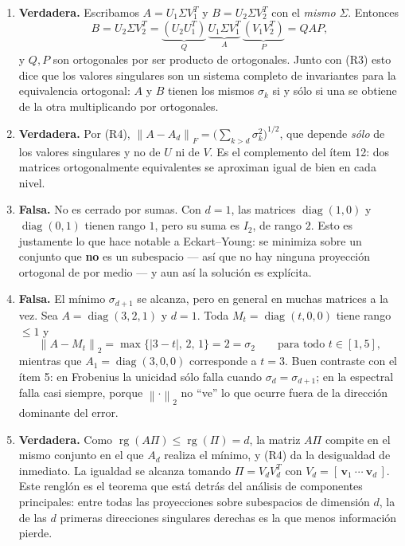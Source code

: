 \documentclass[11pt,a4paper]{article}
\newenvironment{solucion}{\solucionfmt}{\endsolucionfmt}
\newcommand{\bi}[1]{\boldsymbol{#1}}
\DeclareMathOperator{\rg}{rg}
\DeclareMathOperator{\diag}{diag}
\newcommand{\normF}[1]{\left\|#1\right\|_{F}}
\newcommand{\normdos}[1]{\left\|#1\right\|_{2}}
\begin{document}
\begin{solucion}
\begin{enumerate}[label=\textbf{\arabic*.},itemsep=4pt,topsep=4pt,leftmargin=*]
\item \textbf{Verdadera.} Escribamos $A=U_1\Sigma V_1^T$ y $B=U_2\Sigma V_2^T$
con el \emph{mismo} $\Sigma$. Entonces
\[
B=U_2\Sigma V_2^T
=\underbrace{(U_2U_1^T)}_{Q}\,\underbrace{U_1\Sigma V_1^T}_{A}\,
\underbrace{(V_1V_2^T)}_{P} = QAP ,
\]
y $Q,P$ son ortogonales por ser producto de ortogonales. Junto con (R3) esto
dice que los valores singulares son un sistema completo de invariantes para
la equivalencia ortogonal: $A$ y $B$ tienen los mismos $\sigma_k$ si y sólo
si una se obtiene de la otra multiplicando por ortogonales.

\item \textbf{Verdadera.} Por (R4), $\normF{A-A_d}=\bigl(\sum_{k>d}\sigma_k^2\bigr)^{1/2}$,
que depende \emph{sólo} de los valores singulares y no de $U$ ni de $V$. Es
el complemento del ítem 12: dos matrices ortogonalmente equivalentes se
aproximan igual de bien en cada nivel.

\item \textbf{Falsa.} No es cerrado por sumas. Con $d=1$, las matrices
$\diag(1,0)$ y $\diag(0,1)$ tienen rango $1$, pero su suma es $I_2$, de rango
$2$. Esto es justamente lo que hace notable a Eckart--Young: se minimiza
sobre un conjunto que \textbf{no} es un subespacio --- así que no hay ninguna
proyección ortogonal de por medio --- y aun así la solución es explícita.

\item \textbf{Falsa.} El mínimo $\sigma_{d+1}$ se alcanza, pero en general en
muchas matrices a la vez. Sea $A=\diag(3,2,1)$ y $d=1$. Toda
$M_t=\diag(t,0,0)$ tiene rango $\le1$ y
\[
\normdos{A-M_t}=\max\{|3-t|,\,2,\,1\}=2=\sigma_2
\qquad\text{para todo } t\in[1,5] ,
\]
mientras que $A_1=\diag(3,0,0)$ corresponde a $t=3$. Buen contraste con el
ítem 5: en Frobenius la unicidad sólo falla cuando $\sigma_d=\sigma_{d+1}$;
en la espectral falla casi siempre, porque $\normdos{\cdot}$ no ``ve'' lo que
ocurre fuera de la dirección dominante del error.

\item \textbf{Verdadera.} Como $\rg(A\Pi)\le\rg(\Pi)=d$, la matriz $A\Pi$
compite en el mismo conjunto en el que $A_d$ realiza el mínimo, y (R4) da la
desigualdad de inmediato. La igualdad se alcanza tomando
$\Pi=V_dV_d^T$ con $V_d=[\,\bi v_1\ \cdots\ \bi v_d\,]$. Este renglón es el
teorema que está detrás del análisis de componentes principales: entre todas
las proyecciones sobre subespacios de dimensión $d$, la de las $d$ primeras
direcciones singulares derechas es la que menos información pierde.
\end{enumerate}
\end{solucion}
\end{document}
